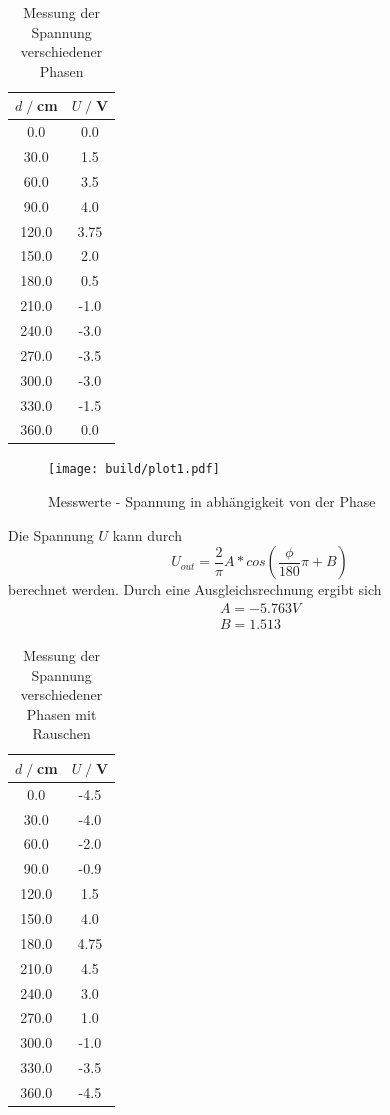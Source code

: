 \begin{table}
    \centering
    \begin{tabular}{c c}
        \toprule
        $d\;/\;$cm & $U\;/\;$V\\
        \midrule
        0.0 & 0.0 \\ 
        30.0 & 1.5 \\ 
        60.0 & 3.5 \\ 
        90.0 & 4.0 \\ 
        120.0 & 3.75 \\ 
        150.0 & 2.0 \\ 
        180.0 & 0.5 \\ 
        210.0 & -1.0 \\ 
        240.0 & -3.0 \\ 
        270.0 & -3.5 \\ 
        300.0 & -3.0 \\ 
        330.0 & -1.5 \\ 
        360.0 & 0.0 \\ 
        \bottomrule
    \end{tabular}
    \caption{Messung der Spannung verschiedener Phasen}
    \label{tab:V1_Werte}
\end{table}
\begin{figure}
    \centering
    \texttt{[image: build/plot1.pdf]}
    \caption{Messwerte - Spannung in abhängigkeit von der Phase}        
    \label{fig:plot1}
\end{figure}

Die Spannung $U$ kann durch 
\begin{equation*}
    U_{out} = \frac{2}{\pi} A*cos(\frac{\phi}{180}\pi+B)
\end{equation*}
berechnet werden.
Durch eine Ausgleichsrechnung ergibt sich
\begin{align*}
    A=  -5.763 V\\
    B=  1.513
\end{align*}
\begin{table}
    \centering
    \begin{tabular}{c c}
        \toprule
        $d\;/\;$cm & $U\;/\;$V\\
        \midrule
        0.0 & -4.5 \\
        30.0 & -4.0 \\
        60.0 & -2.0 \\
        90.0 & -0.9 \\
        120.0 & 1.5 \\
        150.0 & 4.0 \\
        180.0 & 4.75 \\
        210.0 & 4.5 \\
        240.0 & 3.0 \\
        270.0 & 1.0 \\
        300.0 & -1.0 \\
        330.0 & -3.5 \\
        360.0 & -4.5 \\
        \bottomrule
    \end{tabular}
    \caption{Messung der Spannung verschiedener Phasen mit Rauschen}
    \label{tab:V2_Werte}
\end{table}


